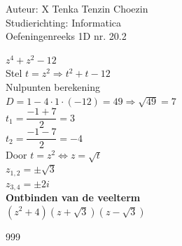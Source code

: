 \documentclass[a4paper]{article}
\begin{document}
  
\noindent \large Auteur: X Tenka Tenzin Choezin \\
\noindent \large Studierichting: Informatica\\
\noindent \large Oefeningenreeks 1D nr. 20.2\\

\medskip

\normalsize

$z^4 + z^2 - 12$\\

Stel $t = z^2 \Rightarrow t^2 + t -12$\\

Nulpunten berekening\\

$D = 1 - 4 \cdot 1 \cdot (-12) = 49 \Rightarrow \sqrt{49} = 7$\\

$t_{1} = \dfrac{-1 + 7}{2} = 3$\\

$t_{2} = \dfrac{-1 - 7}{2} = -4$\\

Door $t = z^2 \Leftrightarrow z = \sqrt{t}$\\

$z_{1,2} = \pm \sqrt{3}$\\

$z_{3,4} = \pm 2i$\\ 

\textbf{Ontbinden van de veelterm}\\

$(z^2 + 4) (z + \sqrt{3}) (z - \sqrt{3})$\\


\begin{thebibliography}{999}
\end{thebibliography}
\end{document}
